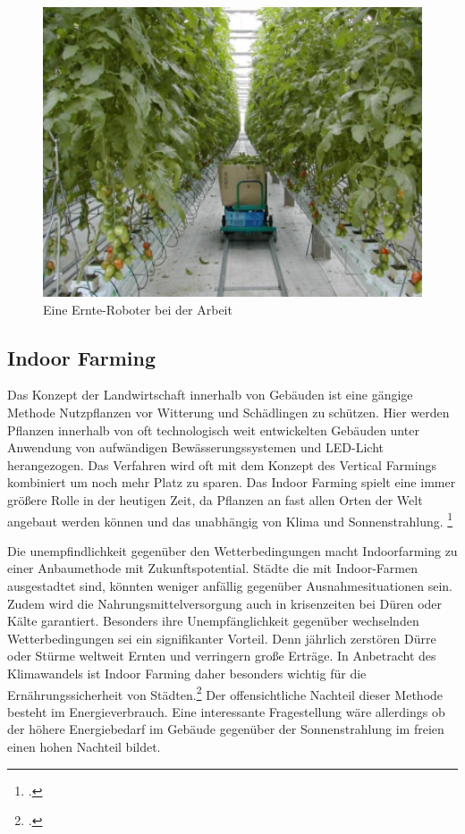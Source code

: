 \documentclass{scrartcl}
\begin{document}
\begin{figure}[htbp]
\centering
\includegraphics[width=14cm]{image_folder/automatisation_kondo.png}
\caption{Eine Ernte-Roboter bei der Arbeit}
\label{fig:Automatisierung}
\end{figure}


\subsection{Indoor Farming}

Das Konzept der Landwirtschaft innerhalb von Gebäuden ist eine gängige Methode Nutzpflanzen vor Witterung und Schädlingen zu schützen. Hier werden Pflanzen innerhalb von oft technologisch weit entwickelten Gebäuden unter Anwendung von aufwändigen Bewässerungssystemen und LED-Licht herangezogen. Das Verfahren wird oft mit dem Konzept des Vertical Farmings kombiniert um noch mehr Platz zu sparen. Das Indoor Farming spielt eine immer größere Rolle in der heutigen Zeit, da Pflanzen an fast allen Orten der Welt angebaut werden können und das unabhängig von Klima und Sonnenstrahlung. \footcite[14.10.2018]{ACHTUNG}

Die unempfindlichkeit gegenüber den Wetterbedingungen macht Indoorfarming zu einer Anbaumethode mit Zukunftspotential. Städte die mit Indoor-Farmen ausgestadtet sind, könnten weniger anfällig gegenüber Ausnahmesituationen sein. Zudem wird die Nahrungsmittelversorgung auch in krisenzeiten bei Düren oder Kälte garantiert. Besonders ihre Unempfänglichkeit gegenüber wechselnden Wetterbedingungen sei ein signifikanter Vorteil. Denn jährlich zerstören Dürre oder Stürme weltweit Ernten und verringern große Erträge. In Anbetracht des Klimawandels ist Indoor Farming daher besonders wichtig für die Ernährungssicherheit von Städten.\footcites[Vgl.][S.27]{Al-Kodmany2018TheCity} Der offensichtliche Nachteil dieser Methode besteht im Energieverbrauch. Eine interessante Fragestellung wäre allerdings ob der höhere Energiebedarf im Gebäude gegenüber der Sonnenstrahlung im freien einen hohen Nachteil bildet. 
\end{document}
